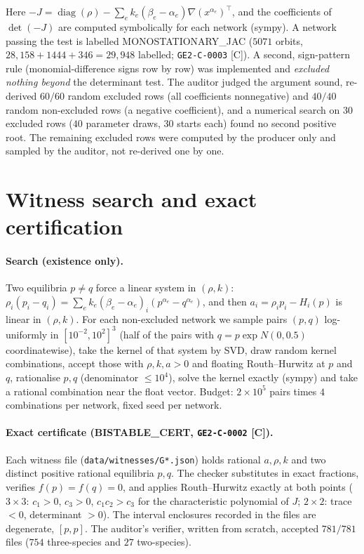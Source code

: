 \documentclass[11pt]{article}
\newcommand{\tier}[1]{\textsf{[#1]}}
\newcommand{\tC}{\tier{C}}
\begin{document}
Here $-J=\operatorname{diag}(\rho)-\sum_e k_e(\beta_e-\alpha_e)\nabla(x^{\alpha_e})^{\!\top}$, and the coefficients of $\det(-J)$ are computed symbolically for each network (sympy). A network passing the test is labelled MONOSTATIONARY\_JAC ($5071$ orbits, $28{,}158+1444+346=29{,}948$ labelled; \texttt{GE2-C-0003} \tC{}). A second, sign-pattern rule (monomial-difference signs row by row) was implemented and \emph{excluded nothing beyond} the determinant test. The auditor judged the argument sound, re-derived $60/60$ random excluded rows (all coefficients nonnegative) and $40/40$ random non-excluded rows (a negative coefficient), and a numerical search on $30$ excluded rows ($40$ parameter draws, $30$ starts each) found no second positive root. The remaining excluded rows were computed by the producer only and sampled by the auditor, not re-derived one by one.

\section{Witness search and exact certification}\label{sec:wit}
\paragraph{Search (existence only).} Two equilibria $p\neq q$ force a linear system in $(\rho,k)$: $\rho_i(p_i-q_i)=\sum_ek_e(\beta_e-\alpha_e)_i(p^{\alpha_e}-q^{\alpha_e})$, and then $a_i=\rho_ip_i-H_i(p)$ is linear in $(\rho,k)$. For each non-excluded network we sample pairs $(p,q)$ log-uniformly in $[10^{-2},10^2]^3$ (half of the pairs with $q=p\exp N(0,0.5)$ coordinatewise), take the kernel of that system by SVD, draw random kernel combinations, accept those with $\rho,k,a>0$ and floating Routh--Hurwitz at $p$ and $q$, rationalise $p,q$ (denominator $\le10^4$), solve the kernel exactly (sympy) and take a rational combination near the float vector. Budget: $2\times10^5$ pairs times $4$ combinations per network, fixed seed per network.

\paragraph{Exact certificate (BISTABLE\_CERT, \texttt{GE2-C-0002} \tC{}).} Each witness file (\texttt{data/witnesses/G*.json}) holds rational $a,\rho,k$ and two distinct positive rational equilibria $p,q$. The checker substitutes in exact fractions, verifies $f(p)=f(q)=0$, and applies Routh--Hurwitz exactly at both points ($3\times3$: $c_1>0$, $c_3>0$, $c_1c_2>c_3$ for the characteristic polynomial of $J$; $2\times2$: trace $<0$, determinant $>0$). The interval enclosures recorded in the files are degenerate, $[p,p]$. The auditor's verifier, written from scratch, accepted $781/781$ files ($754$ three-species and $27$ two-species).
\end{document}
